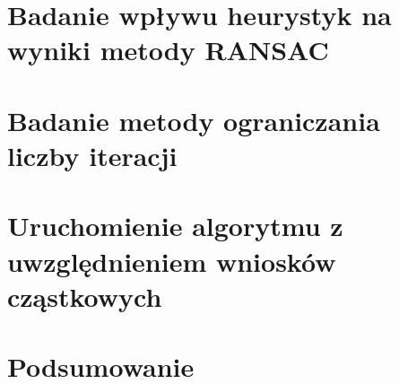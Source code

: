 \documentclass[a4paper,10pt]{article}
\begin{document}
    \newpage
    \justify
    \section{Badanie wpływu heurystyk na wyniki metody RANSAC}
    
    
    \justify
    \section{Badanie metody ograniczania liczby iteracji}
    
    
    \justify
    \section{Uruchomienie algorytmu z uwzględnieniem wniosków cząstkowych}
    
    
    \newpage
    \justify
    \section{Podsumowanie}
    
    
\end{document}
